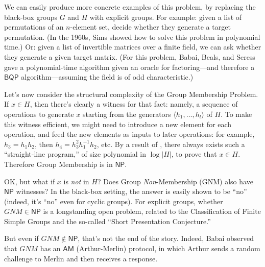 \documentclass[12pt]{report}
\theoremstyle{plain}
\theoremstyle{definition}
\begin{document}
We can easily produce more concrete examples of this problem, by replacing the black-box groups $G$ and $H$ with explicit groups.  For example: given a list of permutations of an $n$-element set, decide whether they generate a target permutation.  (In the 1960s, Sims \cite{sims} showed how to solve this problem in polynomial time.)  Or: given a list of invertible matrices over a finite field, we can ask whether they generate a given target matrix. (For this problem, Babai, Beals, and Seress \cite{BBS09} gave a polynomial-time algorithm given an oracle for factoring---and therefore a $\mathsf{BQP}$ algorithm---assuming the field is of odd characteristic.)

Let's now consider the structural complexity of the Group Membership Problem.  If $x\in H$, then there's clearly a witness for that fact: namely, a sequence of operations to generate $x$ starting from the generators $\langle h_1, \dots, h_l\rangle$ of $H$.  To make this witness efficient, we might need to introduce a new element for each operation, and feed the new elements as inputs to later operations: for example, $h_3=h_1h_2$, then $h_4=h^2_3h_1^{-1}h_2$, etc.  By a result of \cite{DBLP:conf/focs/BabaiS84}, there always exists such a ``straight-line program,'' of size polynomial in $\log |H|$, to prove that $x\in H$.  Therefore Group Membership is in $\mathsf{NP}$.

OK, but what if $x$ is {\em not} in $H$?  Does Group {\em Non}-Membership (GNM) also have $\mathsf{NP}$ witnesses?  In the black-box setting, the answer is easily shown to be ``no'' (indeed, it's ``no'' even for cyclic groups).  For explicit groups, whether $GNM\in \mathsf{NP}$ is a longstanding open problem, related to the Classification of Finite Simple Groups and the so-called ``Short Presentation Conjecture.''

But even if $GNM\not\in \mathsf{NP}$, that's not the end of the story.  Indeed, Babai observed that $GNM$ has an $\mathsf{AM}$ (Arthur-Merlin) protocol, in which Arthur sends a random challenge to Merlin and then receives a response.
\end{document}
